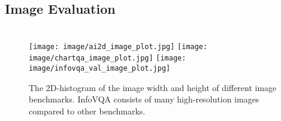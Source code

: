 \subsection{Image Evaluation}
\label{sec: image-eval}
\begin{table}[htp]
    \begin{center}
    \setlength{\tabcolsep}{8pt}
\end{center}
\vspace{1mm}
\caption{Image evaluation results for LongVA on multiple benchmarks. Compared to other image multimodal models, our methods maintain high performance and achieve better scores on InfoVQA\citep{mathew2020docvqa}.}
\vspace{-20pt}
\label{tab:image-results}
\end{table}

\begin{figure}[htp]
    \centering
    \makebox[0.31\textwidth]{}
    \makebox[0.31\textwidth]{}
    \makebox[0.31\textwidth]{}
    \\
    \texttt{[image: image/ai2d\_image\_plot.jpg]}
    \texttt{[image: image/chartqa\_image\_plot.jpg]}
    \texttt{[image: image/infovqa\_val\_image\_plot.jpg]}

    \caption{The 2D-histogram of the image width and height of different image benchmarks. InfoVQA\citep{mathew2020docvqa} consists of many high-resolution images compared to other benchmarks. }
    \label{fig:image-size}
\end{figure}

